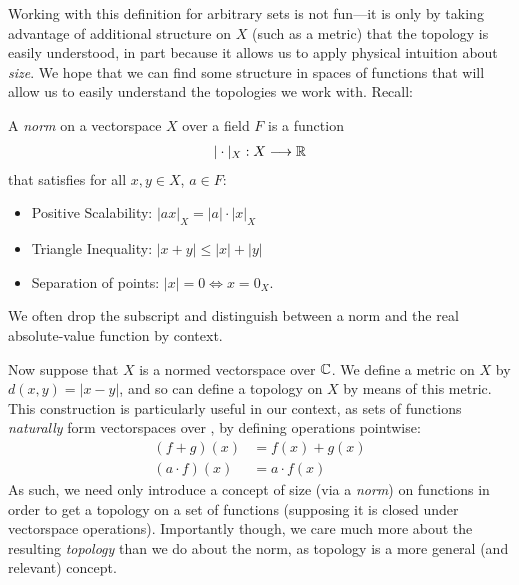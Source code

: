       Working with this definition for arbitrary sets is not fun---it is only by taking advantage of additional structure on $X$ (such as a metric) that the topology is easily understood, in part because it allows us to apply physical intuition about \emph{size}. 
      We hope that we can find some structure in spaces of functions that will allow us to easily understand the topologies we work with.
      Recall:
      \begin{defn}
        A \emph{norm} on a vectorspace $X$ over a field $F$ is a function
        \begin{align*}
          |\cdot|_X:X\longrightarrow\mathbb{R}
        \end{align*}
        that satisfies for all $x,y\in X$, $a\in F$:
        \begin{itemize}
          \item Positive Scalability: $|ax|_X=|a|\cdot|x|_X$
          \item Triangle Inequality: $|x+y|\le|x|+|y|$
          \item Separation of points: $|x|=0\Leftrightarrow x=0_X$.
        \end{itemize}
        We often drop the subscript and distinguish between a norm and the real absolute-value function by context.
      \end{defn}

      Now suppose that $X$ is a normed vectorspace over $\mathbb{C}$.
      We define a metric on $X$ by $d(x,y)=|x-y|$, and so can define a topology on $X$ by means of this metric.
      This construction is particularly useful in our context, as sets of functions \emph{naturally} form vectorspaces over \C, by defining operations pointwise:
      \begin{align*}
        (f+g)(x) &= f(x)+g(x)\\
        (a\cdot f)(x) &= a\cdot f(x)
      \end{align*}
      As such, we need only introduce a concept of size (via a \emph{norm}) on functions in order to get a topology on a set of functions (supposing it is closed under vectorspace operations).
      Importantly though, we care much more about the resulting \emph{topology} than we do about the norm, as topology is a more general (and relevant) concept.

